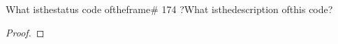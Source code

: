 \documentclass[../../main.tex]{subfiles}
\begin{document}
\begin{wts}
What isthestatus code oftheframe# 174 ?What isthedescription ofthis code? 
\end{wts}
\begin{proof}

\end{proof}
\end{document}
